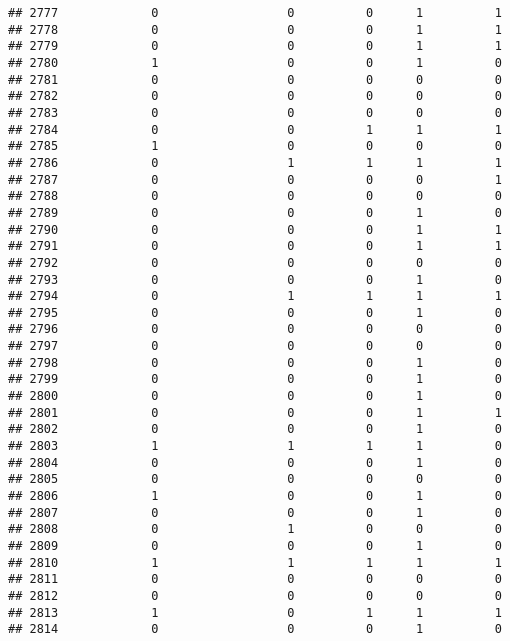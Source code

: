 \documentclass[
]{article}
\begin{document}
\begin{verbatim}
## 2777             0                  0          0      1          1
## 2778             0                  0          0      1          1
## 2779             0                  0          0      1          1
## 2780             1                  0          0      1          0
## 2781             0                  0          0      0          0
## 2782             0                  0          0      0          0
## 2783             0                  0          0      0          0
## 2784             0                  0          1      1          1
## 2785             1                  0          0      0          0
## 2786             0                  1          1      1          1
## 2787             0                  0          0      0          1
## 2788             0                  0          0      0          0
## 2789             0                  0          0      1          0
## 2790             0                  0          0      1          1
## 2791             0                  0          0      1          1
## 2792             0                  0          0      0          0
## 2793             0                  0          0      1          0
## 2794             0                  1          1      1          1
## 2795             0                  0          0      1          0
## 2796             0                  0          0      0          0
## 2797             0                  0          0      0          0
## 2798             0                  0          0      1          0
## 2799             0                  0          0      1          0
## 2800             0                  0          0      1          0
## 2801             0                  0          0      1          1
## 2802             0                  0          0      1          0
## 2803             1                  1          1      1          0
## 2804             0                  0          0      1          0
## 2805             0                  0          0      0          0
## 2806             1                  0          0      1          0
## 2807             0                  0          0      1          0
## 2808             0                  1          0      0          0
## 2809             0                  0          0      1          0
## 2810             1                  1          1      1          1
## 2811             0                  0          0      0          0
## 2812             0                  0          0      0          0
## 2813             1                  0          1      1          1
## 2814             0                  0          0      1          0

\end{verbatim}
\end{document}
